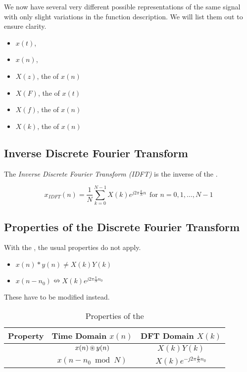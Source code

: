 \begin{remark*}
  We now have several very different possible representations of the same signal with only slight variations in the function description.
  We will list them out to ensure clarity.
  \begin{itemize}[noitemsep]
  \item $x(t)$, 
  \item $x(n)$, 
  \item $X(z)$, the  of $x(n)$
  \item $X(F)$, the  of $x(t)$
  \item $X(f)$, the  of $x(n)$
  \item $X(k)$, the  of $x(n)$
  \end{itemize}
\end{remark*}

\subsection{Inverse Discrete Fourier Transform}\label{subsec:IDFT}
\begin{definition}\label{def:IDFT}
  The \emph{Inverse Discrete Fourier Transform (IDFT)} is the inverse of the .

  \begin{equation}\label{eq:IDFT}
    x_{IDFT}(n) = \frac{1}{N} \sum\limits_{k=0}^{N-1} X(k) e^{j 2\pi \frac{k}{N} n} \:\: \text{for } n = 0, 1, \ldots, N-1
  \end{equation}
\end{definition}

\subsection{Properties of the Discrete Fourier Transform}\label{subsec:DFT_Properties}
With the , the usual properties do not apply.
\begin{itemize}[noitemsep]
\item $x(n) * y(n) \neq X(k)Y(k)$
\item $x(n-n_{0}) \nleftrightarrow X(k) e^{j 2\pi \frac{k}{N} n_{0}}$
\end{itemize}

These have to be modified instead.
\begin{table}[h!]
  \centering
  \begin{tabular}{ccc}
    \toprule
    Property & Time Domain $x(n)$ & DFT Domain $X(k)$ \\
    \midrule
    \nameref{subsubsec:DFT_Properties-Circular_Convolution} & $x(n) \operatorname{\circledast} y(n)$ & $X(k)Y(k)$ \\
    \nameref{subsubsec:DFT_Properties-Time_Shifting} & $x(n - n_{0} \bmod N)$ & $X(k) e^{-j 2\pi \frac{k}{N} n_{0}} $ \\
    \bottomrule
  \end{tabular}
  \caption{Properties of the }
  \label{tab:DFT_Properties}
\end{table}

